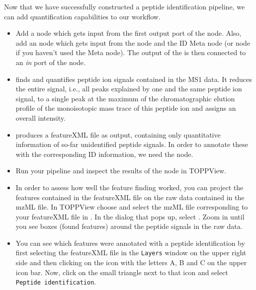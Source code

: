 Now that we have successfully constructed a peptide identification pipeline, we can add quantification capabilities to our workflow.

\begin{itemize}
\item
Add a  node  which gets input from the first output port of the  node. Also, add an  node  which gets input from the  node and the ID Meta node (or  node if you haven't used the Meta node).
The output of the  is then connected to an \textit{in} port of the  node.
\item
{} finds and quantifies peptide ion signals contained in the MS1 data.
It reduces the entire signal, i.e., all peaks explained by one and the same peptide ion signal, to a single peak at the maximum of the chromatographic elution profile of the monoisotopic mass trace of this peptide ion and assigns an overall intensity.
\item
{} produces a featureXML file as output, containing only quantitative information of so-far unidentified peptide signals.
In order to annotate these with the corresponding ID information, we need the  node.
\item Run your pipeline and inspect the results of the  node in TOPPView.
\item In order to assess how well the feature finding worked, you can project the features contained in the featureXML file on the raw data contained in the mzML file.
In TOPPView choose  and select the mzML file corresponding to your featureXML file in .
In the dialog that pops up, select .
Zoom in until you see boxes (found features) around the peptide signals in the raw data.
\item
You can see which features were annotated with a peptide identification by first selecting the featureXML file in the \texttt{Layers} window on the upper right side and then clicking on the icon with the letters A, B and C on the upper icon bar.
Now, click on the small triangle next to that icon and select \texttt{Peptide identification}.
\end{itemize}

